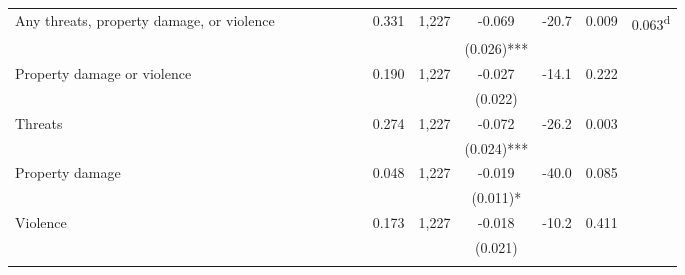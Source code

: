 \begin{tabular}{lcccccccccccc}
\phantom{} Any threats, property damage, or violence \phantom{} &  &  &  &  &  &  & 0.331 & 1,227 & -0.069 & -20.7 & 0.009 & 0.063\textsuperscript{d}\\
 &  &  &  &  &  &  &  &  & (0.026)*** &  &  & \\
\quad Property damage or violence \phantom{} &  &  &  &  &  &  & 0.190 & 1,227 & -0.027 & -14.1 & 0.222 & \\
 &  &  &  &  &  &  &  &  & (0.022) &  &  & \\
\quad Threats \phantom{} &  &  &  &  &  &  & 0.274 & 1,227 & -0.072 & -26.2 & 0.003 & \\
 &  &  &  &  &  &  &  &  & (0.024)*** &  &  & \\
\quad Property damage \phantom{} &  &  &  &  &  &  & 0.048 & 1,227 & -0.019 & -40.0 & 0.085 & \\
 &  &  &  &  &  &  &  &  & (0.011)* &  &  & \\
\quad Violence \phantom{} &  &  &  &  &  &  & 0.173 & 1,227 & -0.018 & -10.2 & 0.411 & \\
 &  &  &  &  &  &  &  &  & (0.021) &  &  & \\
\noalign{\smallskip}\hline\end{tabular}
